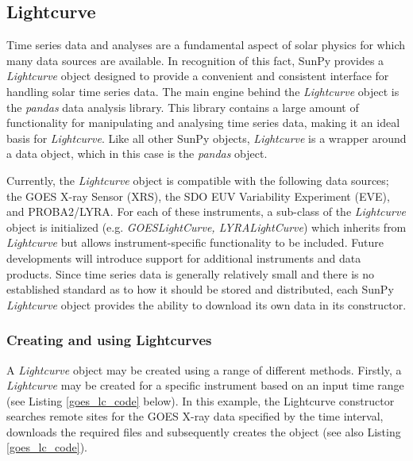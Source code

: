 \subsection{Lightcurve}

Time series data and analyses are a fundamental aspect of solar physics for which many data sources are available. In recognition of this fact, SunPy provides a \textit{Lightcurve} object designed to provide a convenient and consistent interface for handling solar time series data. The main engine behind the \textit{Lightcurve} object is the \textit{pandas} data analysis library. This library contains a large amount of functionality for manipulating and analysing time series data, making it an ideal basis for \textit{Lightcurve}.  Like all other SunPy objects, \textit{Lightcurve} is a wrapper around a data object, which in this case is the \textit{pandas} object. 

Currently, the \textit{Lightcurve} object is compatible with the following data sources; the GOES X-ray Sensor (XRS), the SDO EUV Variability Experiment (EVE), and PROBA2/LYRA. For each of these instruments, a sub-class of the \textit{Lightcurve} object is initialized (e.g. \textit{GOESLightCurve, LYRALightCurve}) which inherits from \textit{Lightcurve} but allows instrument-specific functionality to be included. Future developments will introduce support for additional instruments and data products. 
Since time series data is generally relatively small and there is no established standard as to how it should be stored and distributed, each SunPy \textit{Lightcurve} object provides the ability to download its own data in its constructor.

\subsubsection{Creating and using Lightcurves}

A \textit{Lightcurve} object may be created using a range of different methods. 
Firstly, a \textit{Lightcurve} may be created for a specific instrument based 
on an input time range (see Listing \ref{goes_lc_code} below). In this example, 
the Lightcurve constructor searches remote sites for the GOES X-ray data 
specified by the time interval, downloads the required files and subsequently 
creates the object (see also Listing \ref{goes_lc_code}).

